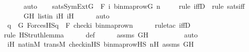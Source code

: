 \begin{isabellebody}
\ \ \ \ \isamarkupfalse%
\ auto\isanewline
\isanewline
\ \ \isamarkupfalse%
\ {\isachardoublequoteopen}sats{\isacharparenleft}{\kern0pt}SymExt{\isacharparenleft}{\kern0pt}G{\isacharparenright}{\kern0pt}{\isacharcomma}{\kern0pt}\ {\isasymphi}{\isacharcomma}{\kern0pt}\ {\isacharbrackleft}{\kern0pt}F{\isacharcomma}{\kern0pt}\ i{\isacharcomma}{\kern0pt}\ binmap{\isacharunderscore}{\kern0pt}row{\isacharparenleft}{\kern0pt}G{\isacharcomma}{\kern0pt}\ n{\isacharparenright}{\kern0pt}{\isacharbrackright}{\kern0pt}{\isacharparenright}{\kern0pt}{\isachardoublequoteclose}\isanewline
\ \ \ \ \isamarkupfalse%
{\isacharparenleft}{\kern0pt}rule\ iffD{}\ {\isacharcomma}{\kern0pt}\ rule\ sats{\isacharunderscore}{\kern0pt}{\isasymphi}{\isacharunderscore}{\kern0pt}iff{\isacharparenright}{\kern0pt}\isanewline
\ \ \ \ \isamarkupfalse%
\ GH\ listin{\isacharprime}{\kern0pt}\ iH\ iH{\isacharprime}{\kern0pt}\isanewline
\ \ \ \ \isamarkupfalse%
\ auto\isanewline
\ \ \isamarkupfalse%
\ \isamarkupfalse%
\ {\isachardoublequoteopen}{\isasymexists}q\ {\isasymin}\ G{\isachardot}{\kern0pt}\ ForcesHS{\isacharparenleft}{\kern0pt}q{\isacharcomma}{\kern0pt}\ {\isasymphi}{\isacharcomma}{\kern0pt}\ {\isacharbrackleft}{\kern0pt}F{\isacharprime}{\kern0pt}{\isacharcomma}{\kern0pt}\ check{\isacharparenleft}{\kern0pt}i{\isacharparenright}{\kern0pt}{\isacharcomma}{\kern0pt}\ binmap{\isacharunderscore}{\kern0pt}row{\isacharprime}{\kern0pt}{\isacharparenleft}{\kern0pt}n{\isacharparenright}{\kern0pt}{\isacharbrackright}{\kern0pt}{\isacharparenright}{\kern0pt}{\isachardoublequoteclose}\ \isanewline
\ \ \ \ \isamarkupfalse%
{\isacharparenleft}{\kern0pt}rule{\isacharunderscore}{\kern0pt}tac\ iffD{}{\isacharparenright}{\kern0pt}\isanewline
\ \ \ \ \ \isamarkupfalse%
{\isacharparenleft}{\kern0pt}rule\ HS{\isacharunderscore}{\kern0pt}truth{\isacharunderscore}{\kern0pt}lemma{\isacharparenright}{\kern0pt}\isanewline
\ \ \ \ \isamarkupfalse%
\ {\isasymphi}{\isacharunderscore}{\kern0pt}def\isanewline
\ \ \ \ \isamarkupfalse%
\ assms\ GH\isanewline
\ \ \ \ \ \ \ \ \isamarkupfalse%
\ auto{\isacharbrackleft}{\kern0pt}{}{\isacharbrackright}{\kern0pt}\isanewline
\ \ \ \ \isamarkupfalse%
\ iH\ nat{\isacharunderscore}{\kern0pt}in{\isacharunderscore}{\kern0pt}M\ transM\ check{\isacharunderscore}{\kern0pt}in{\isacharunderscore}{\kern0pt}HS\ binmap{\isacharunderscore}{\kern0pt}row{\isacharprime}{\kern0pt}{\isacharunderscore}{\kern0pt}HS\ nH\ assms\ GH\isanewline

\end{isabellebody}
